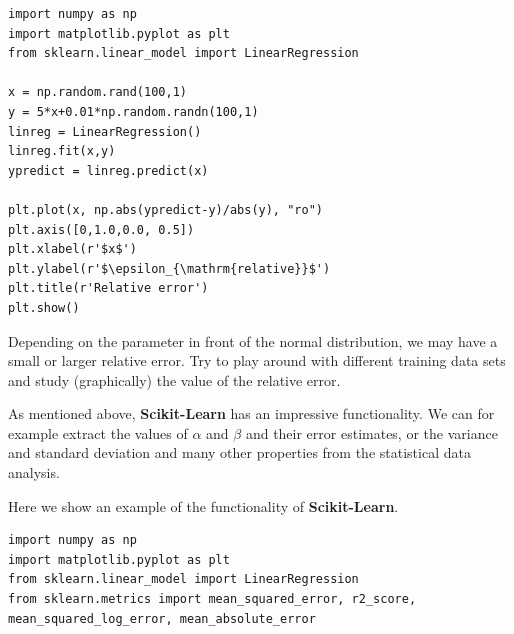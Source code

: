 \documentclass{beamer}
\begin{document}
\begin{frame}
\begin{verbatim}
import numpy as np
import matplotlib.pyplot as plt
from sklearn.linear_model import LinearRegression

x = np.random.rand(100,1)
y = 5*x+0.01*np.random.randn(100,1)
linreg = LinearRegression()
linreg.fit(x,y)
ypredict = linreg.predict(x)

plt.plot(x, np.abs(ypredict-y)/abs(y), "ro")
plt.axis([0,1.0,0.0, 0.5])
plt.xlabel(r'$x$')
plt.ylabel(r'$\epsilon_{\mathrm{relative}}$')
plt.title(r'Relative error')
plt.show()

\end{verbatim}


Depending on the parameter in front of the normal distribution, we may
have a small or larger relative error. Try to play around with
different training data sets and study (graphically) the value of the
relative error.

As mentioned above, \textbf{Scikit-Learn} has an impressive functionality.
We can for example extract the values of $\alpha$ and $\beta$ and
their error estimates, or the variance and standard deviation and many
other properties from the statistical data analysis. 

Here we show an
example of the functionality of \textbf{Scikit-Learn}.





























\begin{verbatim}
import numpy as np 
import matplotlib.pyplot as plt 
from sklearn.linear_model import LinearRegression 
from sklearn.metrics import mean_squared_error, r2_score, mean_squared_log_error, mean_absolute_error


\end{verbatim}
\end{frame}
\end{document}
